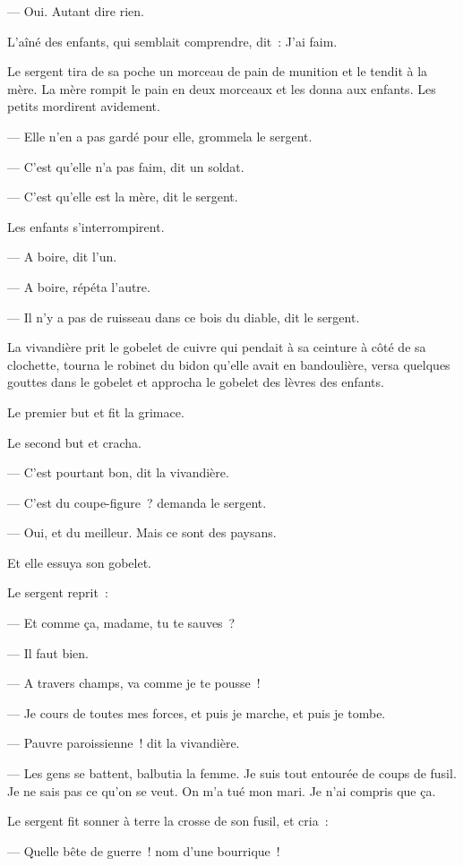\documentclass[french,twoside]{book} %
\begin{document}
— Oui. Autant dire rien.\par
L’aîné des enfants, qui semblait comprendre, dit : J’ai faim.\par
Le sergent tira de sa poche un morceau de pain de munition et le tendit à la mère. La mère rompit le pain en deux morceaux et les donna aux enfants. Les petits mordirent avidement.\par
— Elle n’en a pas gardé pour elle, grommela le sergent.\par
 — C’est qu’elle n’a pas faim, dit un soldat.\par
— C’est qu’elle est la mère, dit le sergent.\par
Les enfants s’interrompirent.\par
— A boire, dit l’un.\par
— A boire, répéta l’autre.\par
— Il n’y a pas de ruisseau dans ce bois du diable, dit le sergent.\par
La vivandière prit le gobelet de cuivre qui pendait à sa ceinture à côté de sa clochette, tourna le robinet du bidon qu’elle avait en bandoulière, versa quelques gouttes dans le gobelet et approcha le gobelet des lèvres des enfants.\par
Le premier but et fit la grimace.\par
Le second but et cracha.\par
— C’est pourtant bon, dit la vivandière.\par
— C’est du coupe-figure ? demanda le sergent.\par
— Oui, et du meilleur. Mais ce sont des paysans.\par
Et elle essuya son gobelet.\par
Le sergent reprit :\par
— Et comme ça, madame, tu te sauves ?\par
— Il faut bien.\par
— A travers champs, va comme je te pousse !\par
— Je cours de toutes mes forces, et puis je marche, et puis je tombe.\par
— Pauvre paroissienne ! dit la vivandière.\par
— Les gens se battent, balbutia la femme. Je suis tout entourée de coups de fusil. Je ne sais pas ce qu’on se veut. On m’a tué mon mari. Je n’ai compris que ça.\par
Le sergent fit sonner à terre la crosse de son fusil, et cria :\par
 — Quelle bête de guerre ! nom d’une bourrique !\par
\end{document}
